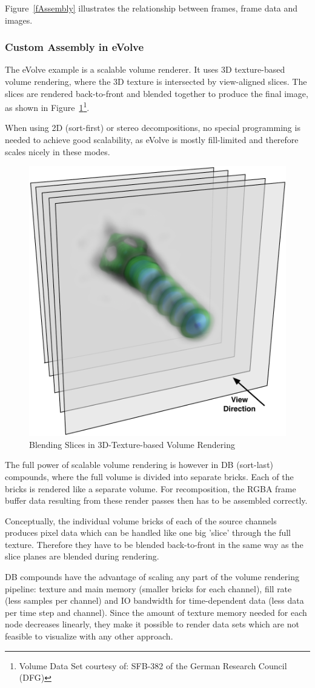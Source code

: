 \documentclass[10pt,a4]{scrartcl}
\newcommand{\fig}[1]{Figure~\ref{#1}}
\begin{document}
\fig{fAssembly} illustrates the relationship between frames, frame data
and images.

\subsubsection{Custom Assembly in eVolve}

The \textsf{eVolve} example is a scalable volume renderer. It uses 3D
texture-based volume rendering, where the 3D texture is intersected by
view-aligned slices. The slices are rendered back-to-front and blended
together to produce the final image, as shown in
\fig{fSlices}\footnote{Volume Data Set courtesy of: SFB-382 of the German
  Research Council (DFG)}.

When using 2D (sort-first) or stereo decompositions, no special
programming is needed to achieve good scalability, as \textsf{eVolve} is
mostly fill-limited and therefore scales nicely in these modes. 

\begin{figure}
  \includegraphics[width=.382\textwidth]{images/slices.pdf}
  {\caption{\small\label{fSlices}Blending Slices in 3D-Texture-based
      Volume Rendering}}
\end{figure}
The full power of scalable volume rendering is however in DB (sort-last)
compounds, where the full volume is divided into separate bricks. Each
of the bricks is rendered like a separate volume. For recomposition, the
\textsf{RGBA} frame buffer data resulting from these render passes then
has to be assembled correctly. 

Conceptually, the individual volume bricks of each of the source
channels produces pixel data which can be handled like one big 'slice'
through the full texture. Therefore they have to be blen\-ded
back-to-front in the same way as the slice planes are blended during
rendering.

DB compounds have the advantage of scaling any part of the volume
rendering pipeline: texture and main memory (smaller bricks for each
channel), fill rate (less samples per channel) and IO bandwidth for
time-dependent data (less data per time step and channel). Since the
amount of texture memory needed for each node decreases linearly, they
make it possible to render data sets which are not feasible to
visualize with any other approach.
\end{document}

